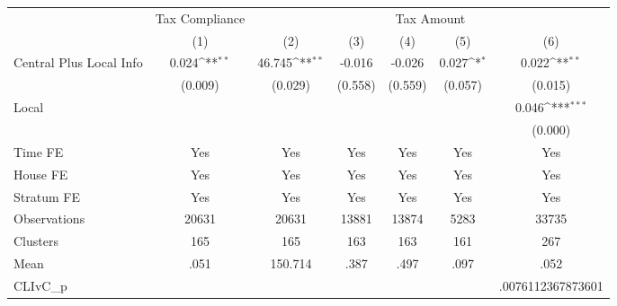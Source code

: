 {
\def\sym#1{\ifmmode^{#1}\else\(^{#1}\)\fi}
\begin{tabular}{l*{6}{c}}
\hline\hline
                &\multicolumn{1}{c}{Tax Compliance}&\multicolumn{5}{c}{Tax Amount}                                                                \\
                &\multicolumn{1}{c}{(1)}         &\multicolumn{1}{c}{(2)}         &\multicolumn{1}{c}{(3)}         &\multicolumn{1}{c}{(4)}         &\multicolumn{1}{c}{(5)}         &\multicolumn{1}{c}{(6)}         \\
\hline
Central Plus Local Info&    0.024\sym{**} &   46.745\sym{**} &   -0.016         &   -0.026         &    0.027\sym{*}  &    0.022\sym{**} \\
                &  (0.009)         &  (0.029)         &  (0.558)         &  (0.559)         &  (0.057)         &  (0.015)         \\
Local           &                  &                  &                  &                  &                  &    0.046\sym{***}\\
                &                  &                  &                  &                  &                  &  (0.000)         \\
Time FE         &      Yes         &      Yes         &      Yes         &      Yes         &      Yes         &      Yes         \\
House FE        &      Yes         &      Yes         &      Yes         &      Yes         &      Yes         &      Yes         \\
Stratum FE      &      Yes         &      Yes         &      Yes         &      Yes         &      Yes         &      Yes         \\
\hline
Observations    &    20631         &    20631         &    13881         &    13874         &     5283         &    33735         \\
Clusters        &      165         &      165         &      163         &      163         &      161         &      267         \\
Mean            &     .051         &  150.714         &     .387         &     .497         &     .097         &     .052         \\
CLIvC\_p         &                  &                  &                  &                  &                  &.0076112367873601         \\
\hline\hline
\end{tabular}
}

